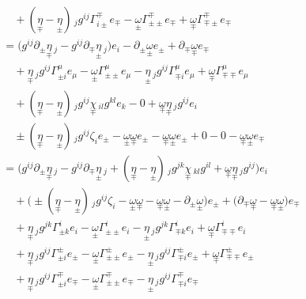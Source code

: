 \documentclass[a4paper,11pt]{article}
\numberwithin{equation}{section}
\theoremstyle{definition}
\begin{document}
\begin{align*}
    &\quad + (\underset{\mp}{\eta}-\underset{\pm}{\eta})\,_jg^{ij}\Gamma_{i\pm}^\mp e_\mp
    - \underset{\pm}{\omega} \Gamma_{\pm\pm}^\mp e_\mp
    + \underset{\mp}{\omega} \Gamma_{\mp\pm}^\mp e_\mp\\
    &=\Big(g^{ij}\partial_\pm \underset{\mp}{\eta}\,_j - g^{ij} \partial_\mp \underset{\pm}{\eta}\,_j\Big)e_i
    - \partial_\pm \underset{\pm}{\omega} e_\pm 
    + \partial_\mp \underset{\mp}{\omega} e_\mp \\
    &\quad + \underset{\mp}{\eta}\,_jg^{ij}\Gamma_{\pm i}^\mu e_\mu
    - \underset{\pm}{\omega} \Gamma_{\pm\pm}^\mu e_\mu - \underset{\pm}{\eta}\,_jg^{ij} \Gamma_{\mp i}^\mu e_\mu
    + \underset{\mp}{\omega} \Gamma_{\mp\mp}^\mu e_\mu\\
    &\quad + (\underset{\mp}{\eta}-\underset{\pm}{\eta})\,_jg^{ij} \underset{\mp}{\chi}\,_{il}g^{kl} e_k - 0
    + \underset{\mp}{\omega} \underset{\mp}{\eta}\,_jg^{ij} e_i\\
    &\quad \pm (\underset{\mp}{\eta}-\underset{\pm}{\eta})\,_jg^{ij}\zeta_i e_\pm
    - \underset{\pm}{\omega}\underset{\mp}{\omega}  e_\pm
    - \underset{\mp}{\omega}\underset{\pm}{\omega} e_\pm + 0 - 0 - \underset{\mp}{\omega} \underset{\pm}{\omega} e_\mp\\
    &=\Big(g^{ij}\partial_\pm \underset{\mp}{\eta}\,_j - g^{ij} \partial_\mp \underset{\pm}{\eta}\,_j + (\underset{\mp}{\eta}-\underset{\pm}{\eta})\,_jg^{jk} \underset{\mp}{\chi}\,_{kl}g^{il} + \underset{\mp}{\omega} \underset{\mp}{\eta}\,_jg^{ij} \Big)e_i\\
    &\quad + \Big(\pm (\underset{\mp}{\eta}-\underset{\pm}{\eta})\,_jg^{ij}\zeta_i - \underset{\pm}{\omega}\underset{\mp}{\omega} - \underset{\mp}{\omega}\underset{\pm}{\omega} - \partial_\pm \underset{\pm}{\omega} \Big)e_\pm 
    + \Big(\partial_\mp \underset{\mp}{\omega} - \underset{\mp}{\omega} \underset{\pm}{\omega} \Big)e_\mp \\
    &\quad + \underset{\mp}{\eta}\,_jg^{jk}\Gamma_{\pm k}^i e_i
    - \underset{\pm}{\omega} \Gamma_{\pm\pm}^i e_i - \underset{\pm}{\eta}\,_jg^{jk} \Gamma_{\mp k}^i e_i
    + \underset{\mp}{\omega} \Gamma_{\mp\mp}^i e_i\\
    &\quad + \underset{\mp}{\eta}\,_jg^{ij}\Gamma_{\pm i}^\pm e_\pm
    - \underset{\pm}{\omega} \Gamma_{\pm\pm}^\pm e_\pm - \underset{\pm}{\eta}\,_jg^{ij} \Gamma_{\mp i}^\pm e_\pm
    + \underset{\mp}{\omega} \Gamma_{\mp\mp}^\pm e_\pm\\
    &\quad + \underset{\mp}{\eta}\,_jg^{ij}\Gamma_{\pm i}^\mp e_\mp
    - \underset{\pm}{\omega} \Gamma_{\pm\pm}^\mp e_\mp - \underset{\pm}{\eta}\,_jg^{ij} \Gamma_{\mp i}^\mp e_\mp

\end{align*}
\end{document}
